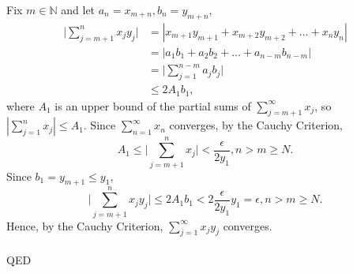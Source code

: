 \documentclass{article}
\begin{document}
            Fix $m \in \mathbb{N}$ and let $a_n=x_{m+n},b_n=y_{m+n}$,
            \begin{align*}
                \Bigg|\sum_{j=m+1}^n x_j y_j\Bigg| & = |x_{m+1}y_{m+1} + x_{m+2}y_{m+2}+\dots+x_n y_n| \\
                & = |a_1b_1 + a_2b_2 + \dots + a_{n-m}b_{n-m}| \\
                & = \Bigg| \sum_{j=1}^{n-m} a_j b_j \Bigg| \\
                & \leq 2A_1b_1,
            \end{align*}
            where $A_1$ is an upper bound of the partial sums of $\sum_{j=m+1}^\infty x_j$, so $|\sum_{j=1}^n x_j| \leq A_1$. Since $\sum_{n=1}^\infty x_n$ converges, by the Cauchy Criterion,
            \begin{equation*}
                A_1 \leq \Bigg| \sum_{j=m+1}^n x_j \Bigg| < \frac{\epsilon}{2y_1}, n > m \geq N.
            \end{equation*}
            Since $b_1 = y_{m+1} \leq y_1$, 
            \begin{equation*}
                \Bigg|\sum_{j=m+1}^n x_j y_j\Bigg| \leq 2A_1b_1 < 2 \frac{\epsilon}{2y_1} y_1 = \epsilon, n > m \geq N.
            \end{equation*}
            Hence, by the Cauchy Criterion, $\sum_{j=1}^\infty x_j y_j$ converges.\\ \\
            QED
\end{document}

